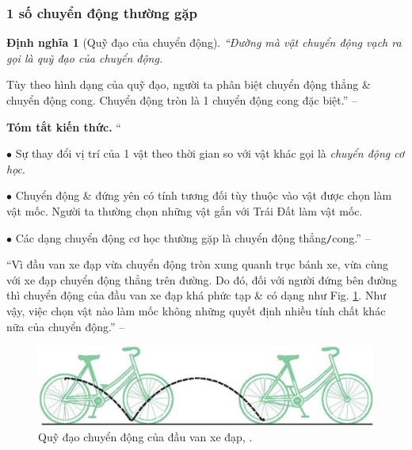 \documentclass{article}
\numberwithin{equation}{section}
\newtheorem{dinhnghia}{Định nghĩa}[section]
\begin{document}
\subsubsection{1 số chuyển động thường gặp}

\begin{dinhnghia}[Quỹ đạo của chuyển động]
	 ``Đường mà vật chuyển động vạch ra gọi là \emph{quỹ đạo của chuyển động}.
\end{dinhnghia}
Tùy theo hình dạng của quỹ đạo, người ta phân biệt chuyển động thẳng \& chuyển động cong. Chuyển động tròn là 1 chuyển động cong đặc biệt.'' -- \cite[p. 6]{SGK_Vat_Ly_8}

\vspace{2mm}
\noindent\textbf{Tóm tắt kiến thức.}
``\begin{enumerate*}
	\item[$\bullet$] Sự thay đổi vị trí của 1 vật theo thời gian so với vật khác gọi là \textit{chuyển động cơ học}.
	\item[$\bullet$] Chuyển động \& đứng yên có tính tương đối tùy thuộc vào vật được chọn làm vật mốc. Người ta thường chọn những vật gắn với Trái Đất làm vật mốc.
	\item[$\bullet$] Các dạng chuyển động cơ học thường gặp là chuyển động thẳng\texttt{/}cong.'' -- \cite[p. 7]{SGK_Vat_Ly_8}
\end{enumerate*}

``Vì đầu van xe đạp vừa chuyển động tròn xung quanh trục bánh xe, vừa cùng với xe đạp chuyển động thẳng trên đường. Do đó, đối với người đứng bên đường thì chuyển động của đầu van xe đạp khá phức tạp \& có dạng như Fig. \ref{fig:quy_dao_chuyen_dong_dau_van_xe_dap}. Như vậy, việc chọn vật nào làm mốc không những quyết định nhiều tính chất khác nữa của chuyển động.'' -- \cite[p. 7]{SGK_Vat_Ly_8}

\begin{figure}[h]
	\centering
	\includegraphics[scale=0.15]{quy_dao_chuyen_dong_dau_van_xe_dap}
	\caption{Quỹ đạo chuyển động của đầu van xe đạp, \cite[Hình 1.5, p. 7]{SGK_Vat_Ly_8}.}
	\label{fig:quy_dao_chuyen_dong_dau_van_xe_dap}
\end{figure}

\end{document}
